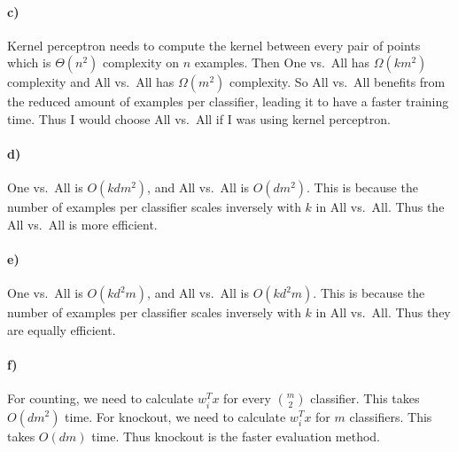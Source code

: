 \documentclass[12pt]{article}
\begin{document}
\paragraph{c)}

Kernel perceptron needs to compute the kernel between every pair of points which is \(\Theta(n^2)\) complexity on \(n\) examples. Then One vs.\ All has \(\Omega(km^2)\)
complexity and All vs.\ All has \(\Omega(m^2)\) complexity. So All vs.\ All benefits from the reduced amount of examples per classifier, leading it to have a faster training time.
Thus I would choose All vs.\ All if I was using kernel perceptron.

\paragraph{d)}

One vs.\ All is \(O(kdm^2)\), and All vs.\ All is \(O(dm^2)\). This is because the number of examples per classifier scales inversely with \(k\) in All vs.\ All. Thus
the All vs.\ All is more efficient.

\paragraph{e)}

One vs.\ All is \(O(kd^2m)\), and All vs.\ All is \(O(kd^2m)\). This is because the number of examples per classifier scales inversely with \(k\) in All vs.\ All. Thus
they are equally efficient.

\paragraph{f)}

For counting, we need to calculate \(w_i^Tx\) for every \(\binom{m}{2}\) classifier. This takes \(O(dm^2)\) time. For knockout, we need to calculate \(w_i^Tx\) for \(m\) classifiers.
This takes \(O(dm)\) time. Thus knockout is the faster evaluation method.
\end{document}
